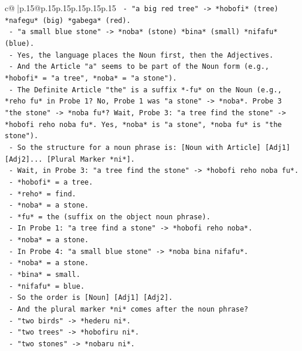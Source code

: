 \documentclass{article}
\begin{document}
{\begin{supertabular}{c@{$\;$}|p{.15\linewidth}@{}p{.15\linewidth}p{.15\linewidth}p{.15\linewidth}p{.15\linewidth}p{.15\linewidth}}
{{{\texttt{      {-} "a big red tree" {-}> *hobofi* (tree) *nafegu* (big) *gabega* (red).} \\
\texttt{      {-} "a small blue stone" {-}> *noba* (stone) *bina* (small) *nifafu* (blue).} \\
\texttt{      {-} Yes, the language places the Noun first, then the Adjectives.} \\
\texttt{      {-} And the Article "a" seems to be part of the Noun form (e.g., *hobofi* = "a tree", *noba* = "a stone").} \\
\texttt{      {-} The Definite Article "the" is a suffix *{-}fu* on the Noun (e.g., *reho fu* in Probe 1? No, Probe 1 was "a stone" {-}> *noba*. Probe 3 "the stone" {-}> *noba fu*? Wait, Probe 3: "a tree find the stone" {-}> *hobofi reho noba fu*. Yes, *noba* is "a stone", *noba fu* is "the stone").} \\
\texttt{      {-} So the structure for a noun phrase is: {[}Noun with Article{]} {[}Adj1{]} {[}Adj2{]}... {[}Plural Marker *ni*{]}.} \\
\texttt{      {-} Wait, in Probe 3: "a tree find the stone" {-}> *hobofi reho noba fu*.} \\
\texttt{        {-} *hobofi* = a tree.} \\
\texttt{        {-} *reho* = find.} \\
\texttt{        {-} *noba* = a stone.} \\
\texttt{        {-} *fu* = the (suffix on the object noun phrase).} \\
\texttt{      {-} In Probe 1: "a tree find a stone" {-}> *hobofi reho noba*.} \\
\texttt{        {-} *noba* = a stone.} \\
\texttt{      {-} In Probe 4: "a small blue stone" {-}> *noba bina nifafu*.} \\
\texttt{        {-} *noba* = a stone.} \\
\texttt{        {-} *bina* = small.} \\
\texttt{        {-} *nifafu* = blue.} \\
\texttt{      {-} So the order is {[}Noun{]} {[}Adj1{]} {[}Adj2{]}.} \\
\texttt{      {-} And the plural marker *ni* comes after the noun phrase?} \\
\texttt{        {-} "two birds" {-}> *hederu ni*.} \\
\texttt{        {-} "two trees" {-}> *hobofiru ni*.} \\
\texttt{        {-} "two stones" {-}> *nobaru ni*.} \\
}}}
\end{supertabular}}
\end{document}
